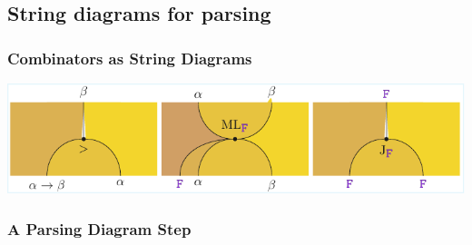 \documentclass[math, english, info]{beamercours}
\begin{document}
\subsection{String diagrams for parsing}
\begin{frame}
	\frametitle{Combinators as String Diagrams}
	\includegraphics[width=\textwidth]{aux/figures/combinators-sd.pdf}
\end{frame}

\begin{frame}
	\frametitle{A Parsing Diagram Step}
\end{frame}
\end{document}
